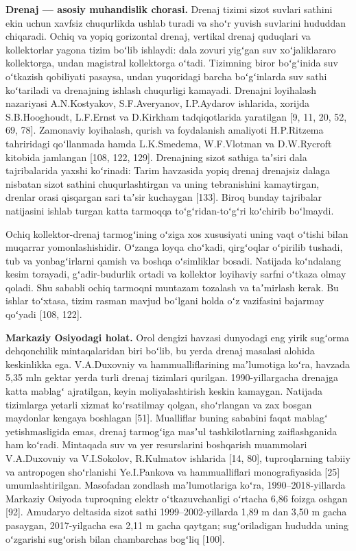 \documentclass[14pt,a4paper,oneside]{extreport}
\begin{document}
\textbf{Drenaj --- asosiy muhandislik chorasi.} Drenaj tizimi sizot
suvlari sathini ekin uchun xavfsiz chuqurlikda ushlab turadi va shoʻr
yuvish suvlarini hududdan chiqaradi. Ochiq va yopiq gorizontal drenaj,
vertikal drenaj quduqlari va kollektorlar yagona tizim boʻlib ishlaydi:
dala zovuri yigʻgan suv xoʻjaliklararo kollektorga, undan magistral
kollektorga oʻtadi. Tizimning biror boʻgʻinida suv oʻtkazish qobiliyati
pasaysa, undan yuqoridagi barcha boʻgʻinlarda suv sathi koʻtariladi va
drenajning ishlash chuqurligi kamayadi. Drenajni loyihalash nazariyasi
A.N.Kostyakov, S.F.Averyanov, I.P.Aydarov ishlarida, xorijda
S.B.Hooghoudt, L.F.Ernst va D.Kirkham tadqiqotlarida yaratilgan {[}9,
11, 20, 52, 69, 78{]}. Zamonaviy loyihalash, qurish va foydalanish
amaliyoti H.P.Ritzema tahriridagi qoʻllanmada hamda L.K.Smedema,
W.F.Vlotman va D.W.Rycroft kitobida jamlangan {[}108, 122, 129{]}.
Drenajning sizot sathiga taʼsiri dala tajribalarida yaxshi koʻrinadi:
Tarim havzasida yopiq drenaj drenajsiz dalaga nisbatan sizot sathini
chuqurlashtirgan va uning tebranishini kamaytirgan, drenlar orasi
qisqargan sari taʼsir kuchaygan {[}133{]}. Biroq bunday tajribalar
natijasini ishlab turgan katta tarmoqqa toʻgʻridan-toʻgʻri koʻchirib
boʻlmaydi.

Ochiq kollektor-drenaj tarmogʻining oʻziga xos xususiyati uning vaqt
oʻtishi bilan muqarrar yomonlashishidir. Oʻzanga loyqa choʻkadi,
qirgʻoqlar oʻpirilib tushadi, tub va yonbagʻirlarni qamish va boshqa
oʻsimliklar bosadi. Natijada koʻndalang kesim torayadi, gʻadir-budurlik
ortadi va kollektor loyihaviy sarfni oʻtkaza olmay qoladi. Shu sababli
ochiq tarmoqni muntazam tozalash va taʼmirlash kerak. Bu ishlar
toʻxtasa, tizim rasman mavjud boʻlgani holda oʻz vazifasini bajarmay
qoʻyadi {[}108, 122{]}.

\textbf{Markaziy Osiyodagi holat.} Orol dengizi havzasi dunyodagi eng
yirik sugʻorma dehqonchilik mintaqalaridan biri boʻlib, bu yerda drenaj
masalasi alohida keskinlikka ega. V.A.Duxovniy va hammualliflarining
maʼlumotiga koʻra, havzada 5,35 mln gektar yerda turli drenaj tizimlari
qurilgan. 1990-yillargacha drenajga katta mablagʻ ajratilgan, keyin
moliyalashtirish keskin kamaygan. Natijada tizimlarga yetarli xizmat
koʻrsatilmay qolgan, shoʻrlangan va zax bosgan maydonlar kengaya
boshlagan {[}51{]}. Mualliflar buning sababini faqat mablagʻ
yetishmasligida emas, drenaj tarmogʻiga masʼul tashkilotlarning
zaiflashganida ham koʻradi. Mintaqada suv va yer resurslarini boshqarish
muammolari V.A.Duxovniy va V.I.Sokolov, R.Kulmatov ishlarida {[}14,
80{]}, tuproqlarning tabiiy va antropogen shoʻrlanishi Ye.I.Pankova va
hammualliflari monografiyasida {[}25{]} umumlashtirilgan. Masofadan
zondlash maʼlumotlariga koʻra, 1990--2018-yillarda Markaziy Osiyoda
tuproqning elektr oʻtkazuvchanligi oʻrtacha 6,86 foizga oshgan {[}92{]}.
Amudaryo deltasida sizot sathi 1999--2002-yillarda 1,89 m dan 3,50 m
gacha pasaygan, 2017-yilgacha esa 2,11 m gacha qaytgan; sugʻoriladigan
hududda uning oʻzgarishi sugʻorish bilan chambarchas bogʻliq {[}100{]}.
\end{document}
